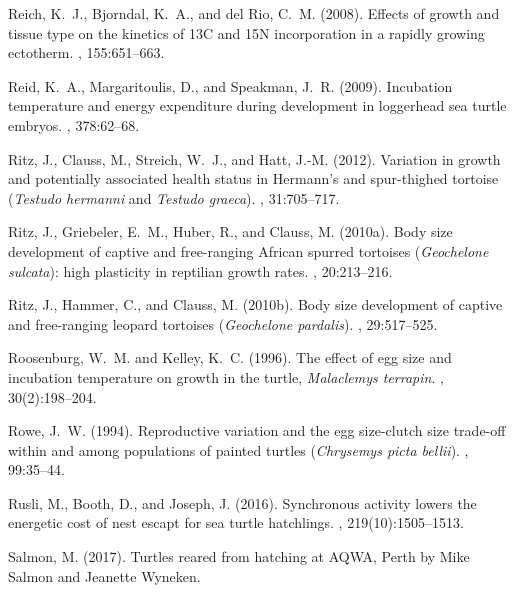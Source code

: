\documentclass{article}
\begin{document}
\begin{thebibliography}{}
Reich, K.~J., Bjorndal, K.~A., and del Rio, C.~M. (2008).
\newblock Effects of growth and tissue type on the kinetics of 13{C} and 15{N}
  incorporation in a rapidly growing ectotherm.
, 155:651--663.

Reid, K.~A., Margaritoulis, D., and Speakman, J.~R. (2009).
\newblock Incubation temperature and energy expenditure during development in
  loggerhead sea turtle embryos.
, 378:62--68.

Ritz, J., Clauss, M., Streich, W.~J., and Hatt, J.-M. (2012).
\newblock Variation in growth and potentially associated health status in
  {H}ermann's and spur-thighed tortoise (\emph{Testudo hermanni} and
  \emph{Testudo graeca}).
, 31:705--717.

Ritz, J., Griebeler, E.~M., Huber, R., and Clauss, M. (2010a).
\newblock Body size development of captive and free-ranging {A}frican spurred
  tortoises (\emph{Geochelone sulcata}): high plasticity in reptilian growth
  rates.
, 20:213--216.

Ritz, J., Hammer, C., and Clauss, M. (2010b).
\newblock Body size development of captive and free-ranging leopard tortoises
  (\emph{Geochelone pardalis}).
, 29:517--525.

Roosenburg, W.~M. and Kelley, K.~C. (1996).
\newblock The effect of egg size and incubation temperature on growth in the
  turtle, \emph{Malaclemys terrapin}.
, 30(2):198--204.

Rowe, J.~W. (1994).
\newblock Reproductive variation and the egg size-clutch size trade-off within
  and among populations of painted turtles (\emph{Chrysemys picta bellii}).
, 99:35--44.

Rusli, M., Booth, D., and Joseph, J. (2016).
\newblock Synchronous activity lowers the energetic cost of nest escapt for sea
  turtle hatchlings.
, 219(10):1505--1513.

Salmon, M. (2017).
\newblock Turtles reared from hatching at AQWA, Perth by Mike Salmon and
  Jeanette Wyneken.


\end{thebibliography}
\end{document}
